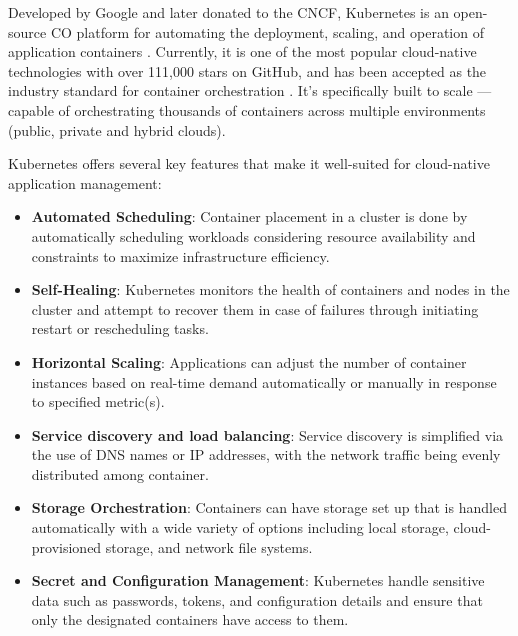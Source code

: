 Developed by Google and later donated to the CNCF, Kubernetes is an open-source CO platform for automating the deployment, scaling, and operation of application containers \cite{Kubernetes}. Currently, it is one of the most popular cloud-native technologies with over 111,000 stars on GitHub, and has been accepted as the industry standard for container orchestration \cite{truyenComprehensiveFeatureComparison2019, KubernetesKubernetesProductionGrade}. It's specifically built to scale — capable of orchestrating thousands of containers across multiple environments (public, private and hybrid clouds).

Kubernetes offers several key features that make it well-suited for cloud-native application management:

\begin{itemize}

\item \textbf{Automated Scheduling}: Container placement in a cluster is done by automatically scheduling workloads considering resource availability and constraints to maximize infrastructure efficiency. 

\item \textbf{Self-Healing}: Kubernetes monitors the health of containers and nodes in the cluster and attempt to recover them in case of failures through initiating restart or rescheduling tasks.

\item \textbf{Horizontal Scaling}: Applications can adjust the number of container instances based on real-time demand automatically or manually in response to specified metric(s).

\item \textbf{Service discovery and load balancing}: Service discovery is simplified via the use of DNS names or IP addresses, with the network traffic being evenly distributed among container.

\item \textbf{Storage Orchestration}: Containers can have storage set up that is handled automatically with a wide variety of options including local storage, cloud-provisioned storage, and network file systems.

\item \textbf{Secret and Configuration Management}: Kubernetes handle sensitive data such as passwords, tokens, and configuration details and ensure that only the designated containers have access to them. 

\end{itemize}

